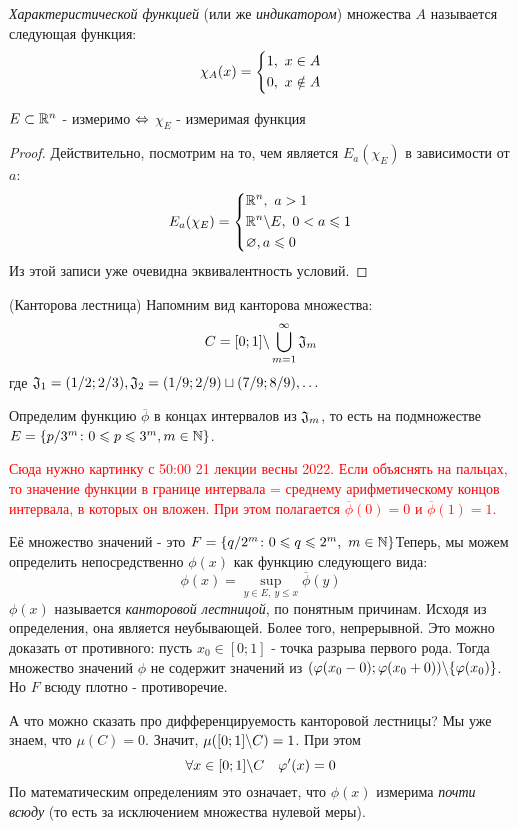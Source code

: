 \begin{definition}
	\textit{Характеристической функцией} (или же \textit{индикатором}) множества $A$ называется следующая функция:
	\[
		\chi_A(x) = \left\{\begin{aligned}
			&{1,\ x \in A}
			\\
			&{0,\ x \notin A}
		\end{aligned}\right.
	\]
\end{definition}

\begin{proposition}
	$E \subset \mathbb{R}^n$ - измеримо $\Leftrightarrow$ $\chi_E$ - измеримая функция
\end{proposition}

\begin{proof}
	Действительно, посмотрим на то, чем является $E_a(\chi_E)$ в зависимости от $a$:
	\[
		E_a(\chi_E) = \left\{\begin{aligned}
			&{\mathbb{R}^n,\ a > 1}
			\\
			&{\mathbb{R}^n \backslash E,\ 0 < a \leqslant 1}
			\\
			&{\varnothing, a \leqslant 0}
		\end{aligned}\right.
	\]
	Из этой записи уже очевидна эквивалентность условий.
\end{proof}

\begin{example} (Канторова лестница)
	Напомним вид канторова множества:
	\[
		C = [0; 1] \backslash \bigcup_{m = 1}^\infty \mathfrak{J}_m
	\]
	где $\mathfrak{J}_1 = (1/2; 2/3), \mathfrak{J}_2 = (1/9; 2/9) \sqcup (7/9; 8/9), \ldots$
	
	Определим функцию $\overline{\phi}$ в концах интервалов из $\mathfrak{J}_m$, то есть на подмножестве $E = \{p/3^m \colon 0 \leqslant p \leqslant 3^m, m \in \mathbb{N}\}$.
	
	\textcolor{red}{Сюда нужно картинку с 50:00 21 лекции весны 2022. Если объяснять на пальцах, то значение функции в границе интервала = среднему арифметическому концов интервала, в которых он вложен. При этом полагается $\overline{\phi}(0) = 0$ и $\overline{\phi}(1) = 1$.}
	
	Её множество значений - это $F = \{q / 2^m \colon 0 \leqslant q \leqslant 2^m,\ m \in \mathbb{N}\}$Теперь, мы можем определить непосредственно $\phi(x)$ как функцию следующего вида:
	\[
		\phi(x) = \sup_{y \in E,\ y \le x} \overline{\phi}(y)
	\]
	$\phi(x)$ называется \textit{канторовой лестницой}, по понятным причинам. Исходя из определения, она является неубывающей. Более того, непрерывной. Это можно доказать от противного: пусть $x_0 \in [0; 1]$ - точка разрыва первого рода. Тогда множество значений $\phi$ не содержит значений из $(\varphi(x_0 - 0); \varphi(x_0 + 0)) \backslash \{\varphi(x_0)\}$. Но $F$ всюду плотно - противоречие.
	
	А что можно сказать про дифференцируемость канторовой лестницы? Мы уже знаем, что $\mu(C) = 0$. Значит, $\mu([0; 1] \backslash C) = 1$. При этом
	\[
		\forall x \in [0; 1] \backslash C \quad \varphi'(x) = 0
	\]
	По математическим определениям это означает, что $\phi(x)$ измерима \textit{почти всюду} (то есть за исключением множества нулевой меры).
\end{example}


